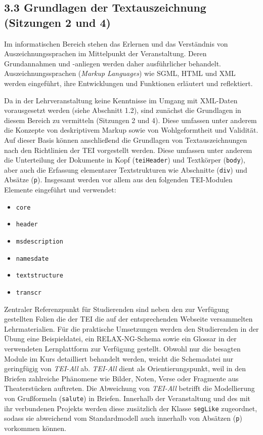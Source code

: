 \documentclass[
          a4paper,
        ]{article}
\newcommand{\passthrough}[1]{#1}
\begin{document}
\subsection{3.3 Grundlagen der Textauszeichnung (Sitzungen 2 und
4)}\label{grundlagen-der-textauszeichnung-sitzungen-2-und-4}

Im informatischen Bereich stehen das Erlernen und das Verständnis von
Auszeichnungssprachen im Mittelpunkt der Veranstaltung. Deren
Grundannahmen und -anliegen werden daher ausführlicher behandelt.
Auszeichnungssprachen (\emph{Markup Languages}) wie SGML, HTML und XML
werden eingeführt, ihre Entwicklungen und Funktionen erläutert und
reflektiert.

Da in der Lehrveranstaltung keine Kenntnisse im Umgang mit XML-Daten
vorausgesetzt werden (siehe Abschnitt 1.2), sind zunächst die Grundlagen
in diesem Bereich zu vermitteln (Sitzungen 2 und 4). Diese umfassen
unter anderem die Konzepte von deskriptivem Markup sowie von
Wohlgeformtheit und Validität. Auf dieser Basis können anschließend die
Grundlagen von Textauszeichnungen nach den Richtlinien der TEI
vorgestellt werden. Diese umfassen unter anderem die Unterteilung der
Dokumente in Kopf (\passthrough{\lstinline!teiHeader!}) und Textkörper
(\passthrough{\lstinline!body!}), aber auch die Erfassung elementarer
Textstrukturen wie Abschnitte (\passthrough{\lstinline!div!}) und
Absätze (\passthrough{\lstinline!p!}). Insgesamt werden vor allem aus
den folgenden TEI-Modulen Elemente eingeführt und verwendet:

\begin{itemize}
\item
  \passthrough{\lstinline!core!}
\item
  \passthrough{\lstinline!header!}
\item
  \passthrough{\lstinline!msdescription!}
\item
  \passthrough{\lstinline!namesdate!}
\item
  \passthrough{\lstinline!textstructure!}
\item
  \passthrough{\lstinline!transcr!}
\end{itemize}

Zentraler Referenzpunkt für Studierenden sind neben den zur Verfügung
gestellten Folien die der TEI die auf der entsprechenden Webseite
versammelten Lehrmaterialien. Für die praktische Umsetzungen werden den
Studierenden in der Übung eine Beispieldatei, ein RELAX-NG-Schema sowie
ein Glossar in der verwendeten Lernplattform zur Verfügung gestellt.
Obwohl nur die besagten Module im Kurs detailliert behandelt werden,
weicht die Schemadatei nur geringfügig von \emph{TEI-All} ab.
\emph{TEI-All} dient als Orientierungspunkt, weil in den Briefen
zahlreiche Phänomene wie Bilder, Noten, Verse oder Fragmente aus
Theaterstücken auftreten. Die Abweichung von \emph{TEI-All} betrifft die
Modellierung von Grußformeln (\passthrough{\lstinline!salute!}) in
Briefen. Innerhalb der Veranstaltung und des mit ihr verbundenen
Projekts werden diese zusätzlich der Klasse
\passthrough{\lstinline!segLike!} zugeordnet, sodass sie abweichend vom
Standardmodell auch innerhalb von Absätzen (\passthrough{\lstinline!p!})
vorkommen können.
\end{document}

